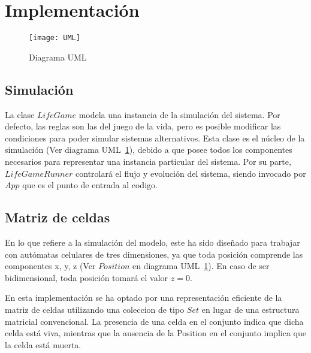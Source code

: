 \section{Implementación}\label{sec:implementacion}

\begin{figure}[H]
    \centering
    \texttt{[image: UML]}
    \caption{Diagrama UML}
    \label{fig:UML-Simulacion}
\end{figure}

\subsection{Simulación}\label{label:simulacion}
    La clase $LifeGame$ modela una instancia de la simulación del sistema. Por defecto, las reglas son las del juego de la vida,
    pero es posible modificar las condiciones para poder simular sistemas alternativos. Esta clase es el núcleo de la
    simulación (Ver diagrama UML~\ref{fig:UML-Simulacion}), debido a que posee todos los componentes necesarios
    para representar una instancia particular del sistema. Por su parte, $LifeGameRunner$ controlará el flujo y evolución del sistema,
    siendo invocado por $App$ que es el punto de entrada al codigo.

\subsection{Matriz de celdas}\label{subsec:matriz de celdas}
    En lo que refiere a la simulación del modelo, este ha sido diseñado para trabajar con autómatas celulares de tres
    dimensiones, ya que toda posición comprende las componentes x, y, z (Ver $Position$ en diagrama UML~\ref{fig:UML-Simulacion}).
    En caso de ser bidimensional, toda posición tomará el valor $z = 0$.

    En esta implementación se ha optado por una representación eficiente de la matriz de celdas utilizando una coleccion de
    tipo $Set$ en lugar de una estructura matricial convencional.
    La presencia de una celda en el conjunto indica que dicha celda está viva, mientras que la ausencia de la Position en
    el conjunto implica que la celda está muerta.

